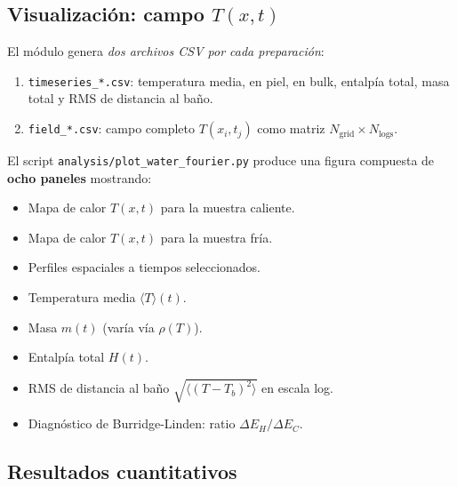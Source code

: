\subsection{Visualización: campo $T(x, t)$}

El módulo genera \emph{dos archivos CSV por cada preparación}:
\begin{enumerate}
\item \texttt{timeseries\_*.csv}: temperatura media, en piel, en bulk, entalpía 
total, masa total y RMS de distancia al baño.
\item \texttt{field\_*.csv}: campo completo $T(x_i, t_j)$ como matriz 
$N_{\mathrm{grid}} \times N_{\mathrm{logs}}$.
\end{enumerate}
%
El script \texttt{analysis/plot\_water\_fourier.py} produce una figura 
compuesta de \textbf{ocho paneles} mostrando:
\begin{itemize}
\item Mapa de calor $T(x, t)$ para la muestra caliente.
\item Mapa de calor $T(x, t)$ para la muestra fría.
\item Perfiles espaciales a tiempos seleccionados.
\item Temperatura media $\langle T \rangle(t)$.
\item Masa $m(t)$ (varía vía $\rho(T)$).
\item Entalpía total $H(t)$.
\item RMS de distancia al baño $\sqrt{\langle (T - T_b)^2 \rangle}$ en escala log.
\item Diagnóstico de Burridge-Linden: ratio $\Delta E_H / \Delta E_C$.
\end{itemize}

\subsection{Resultados cuantitativos}

